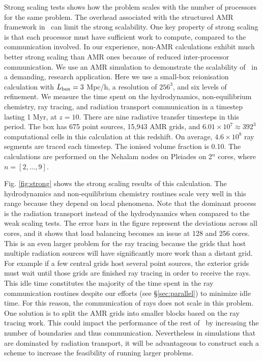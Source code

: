 \documentclass[useAMS,usenatbib]{mn2e}
\begin{document}
Strong scaling tests shows how the problem scales with the number of
processors for the same problem.  The overhead associated with the
structured AMR framework in \enzo~can limit the strong scalability.
One key property of strong scaling is that each processor must have
sufficient work to compute, compared to the communication involved.
In our experience, non-AMR calculations exhibit much better strong
scaling than AMR ones because of reduced inter-processor
communication.  We use an AMR simulation to demonstrate the scalability
of \moray~in a demanding, research application.  Here we use a
small-box reionisation calculation with $L_{\rm box} = 3$ Mpc/h, a
resolution of $256^3$, and six levels of refinement.  We measure the
time spent on the hydrodynamics, non-equilibrium chemistry, ray
tracing, and radiation transport communication in a timestep lasting 1
Myr, at $z=10$.  There are nine radiative transfer timesteps in this
period.  The box has 675 point sources, 15,943 AMR grids, and $6.01
\times 10^7 \approx 392^3$ computational cells in this calculation at
this redshift.  On average, $4.6 \times 10^8$ ray segments are traced
each timestep.  The ionised volume fraction is 0.10.  The calculations
are performed on the Nehalam nodes on Pleiades on 2$^n$ cores, where
$n = [2,...,9]$.

Fig. \ref{fig:strong} shows the strong scaling results of this
calculation.  The hydrodynamics and non-equilibrium chemistry routines
scale very well in this range because they depend on local phenomena.
Note that the dominant process is the radiation transport instead of
the hydrodynamics when compared to the weak scaling tests.  The error
bars in the figure represent the deviations across all cores, and it
shows that load balancing becomes an issue at 128 and 256 cores.  This
is an even larger problem for the ray tracing because the grids that
host multiple radiation sources will have significantly more work than
a distant grid.  For example if a few central grids host several point
sources, the exterior grids must wait until those grids are finished
ray tracing in order to receive the rays.  This idle time constitutes
the majority of the time spent in the ray communication routines
despite our efforts (see \S\ref{sec:parallel}) to minimize idle time.
For this reason, the communication of rays does not scale in this
problem.  One solution is to split the AMR grids into smaller blocks
based on the ray tracing work.  This could impact the performance of
the rest of \enzo~by increasing the number of boundaries and thus
communication.  Nevertheless in simulations that are dominated by
radiation transport, it will be advantageous to construct such a
scheme to increase the feasibility of running larger problems.
\end{document}
